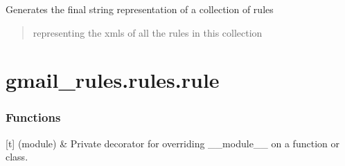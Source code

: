 \documentclass[letterpaper,10pt,english]{sphinxmanual}
\begin{document}
\begin{fulllineitems}
\begin{fulllineitems}
\end{fulllineitems}


\begin{fulllineitems}
\label{\detokenize{_autosummary/gmail_rules.actions.rule_collection:gmail_rules.actions.rule_collection.Rule_Collection.final_string}}
\pysigstartsignatures
{}
\pysigstopsignatures
\sphinxAtStartPar
Generates the final string representation of a collection of rules
\begin{quote}\begin{description}
\sphinxAtStartPar
{} representing the xmls of all the rules in this collection

\sphinxAtStartPar
{}

\end{description}\end{quote}

\end{fulllineitems}


\end{fulllineitems}


\sphinxstepscope


\section{gmail\_rules.rules.rule}
\label{\detokenize{_autosummary/gmail_rules.rules.rule:module-gmail_rules.rules.rule}}\label{\detokenize{_autosummary/gmail_rules.rules.rule:gmail-rules-rules-rule}}\label{\detokenize{_autosummary/gmail_rules.rules.rule::doc}}\subsubsection*{Functions}


\begin{savenotes}\sphinxattablestart
\sphinxthistablewithglobalstyle
\sphinxthistablewithnovlinesstyle
\centering
\begin{tabulary}{\linewidth}[t]{}
\sphinxtoprule
\sphinxtableatstartofbodyhook
\sphinxAtStartPar
{}(module)
&
\sphinxAtStartPar
Private decorator for overriding \_\_module\_\_ on a function or class.
\\
\sphinxbottomrule
\end{tabulary}
\sphinxtableafterendhook\par
\sphinxattableend\end{savenotes}
\end{document}
